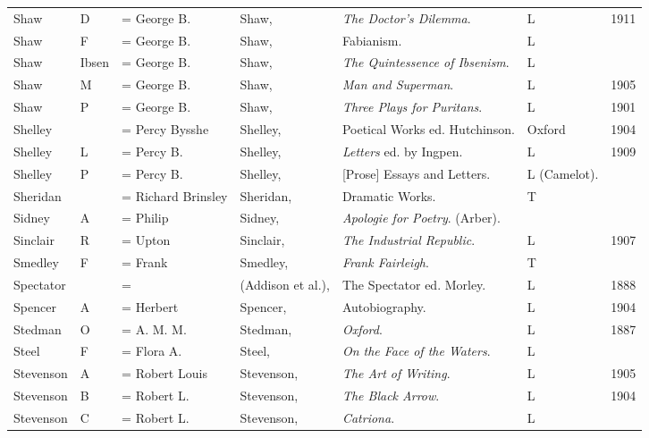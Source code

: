 \begin{sidewaystable}
\centering
\begin{tabular}{p{} p{} p{} p{} p{} p{} p{}}
Shaw& D & = George B. & Shaw, & \textit{The Doctor's Dilemma}. & L & 1911 \\
Shaw& F & = George B. & Shaw, & Fabianism. & L & \\
Shaw& Ibsen & = George B. & Shaw, & \textit{The Quintessence of Ibsenism}. & L & \\
Shaw& M & = George B. & Shaw, & \textit{Man and Superman}. & L & 1905 \\
Shaw& P & = George B. & Shaw, & \textit{Three Plays for Puritans}. & L & 1901 \\
Shelley & & = Percy Bysshe & Shelley, & Poetical Works ed. Hutchinson. & Oxford & 1904 \\
Shelley& L & = Percy B. & Shelley, & \textit{Letters} ed. by Ingpen. & L & 1909 \\
Shelley& P & = Percy B. & Shelley, & [Prose] Essays and Letters. & L (Camelot).&  \\
Sheridan & & = Richard Brinsley & Sheridan, & Dramatic Works. & T & \\
Sidney & A & = Philip & Sidney, & \textit{Apologie for Poetry}. (Arber). & & \\
Sinclair & R & = Upton & Sinclair, & \textit{The Industrial Republic}. & L & 1907 \\
Smedley & F & = Frank & Smedley, & \textit{Frank Fairleigh}. & T & \\
Spectator & & = & (Addison et al.), & The Spectator ed. Morley. & L & 1888 \\
Spencer & A & = Herbert & Spencer, & Autobiography. & L & 1904 \\
Stedman & O & = A. M. M. & Stedman, & \textit{Oxford}. & L & 1887 \\
Steel & F & = Flora A. & Steel, & \textit{On the Face of the Waters}. & L & \\
Stevenson & A & = Robert Louis & Stevenson, & \textit{The Art of Writing}. & L & 1905 \\
Stevenson & B & = Robert L. & Stevenson, & \textit{The Black Arrow}. & L & 1904 \\
Stevenson & C & = Robert L. & Stevenson, & \textit{Catriona}. & L & \\
\end{tabular}
\end{sidewaystable}

